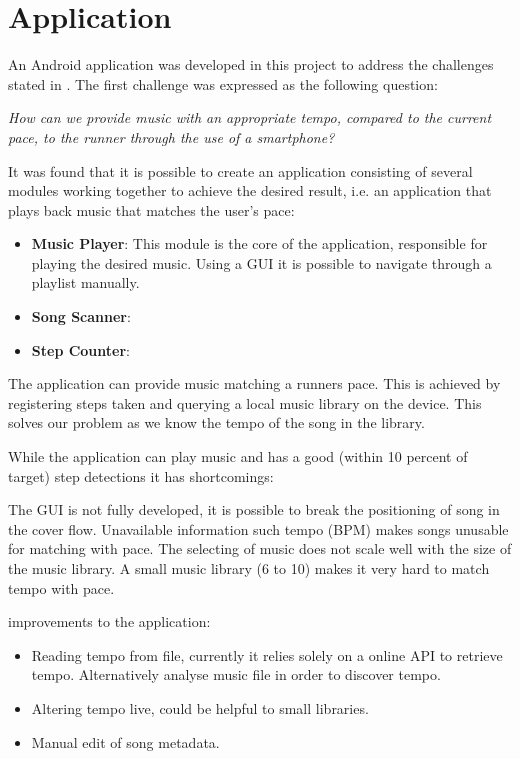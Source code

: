 \section{Application}
An Android application was developed in this project to address the challenges stated in . The first challenge was expressed as the following question:

\begin{center}
\textit{How can we provide music with an appropriate tempo, compared to the current pace, to the runner through the use of a smartphone?}
\end{center}

It was found that it is possible to create an application consisting of several modules working together to achieve the desired result, i.e. an application that plays back music that matches the user's pace:

\begin{itemize}
\item \textbf{Music Player}: This module is the core of the application, responsible for playing the desired music. Using a GUI it is possible to navigate through a playlist manually.
\item \textbf{Song Scanner}:
\item \textbf{Step Counter}:
\end{itemize}


The application can provide music matching a runners pace. This is achieved by registering steps taken and querying a local music library on the device. This solves our problem as we know the tempo of the song in the library.

While the application can play music and has a good (within 10 percent of target) step detections it has shortcomings: 

The GUI is not fully developed, it is possible to break the positioning of song in the cover flow. Unavailable information such tempo (BPM) makes songs unusable for matching with pace. The selecting of music does not scale well with the size of the music library. A small music library (6 to 10) makes it very hard to match tempo with pace. 

improvements to the application:
\begin{itemize}
\item Reading tempo from file, currently it relies solely on a online API to retrieve tempo.
\subitem Alternatively analyse music file in order to discover tempo.
\item Altering tempo live, could be helpful to small libraries.
\item Manual edit of song metadata. 
\end{itemize}


